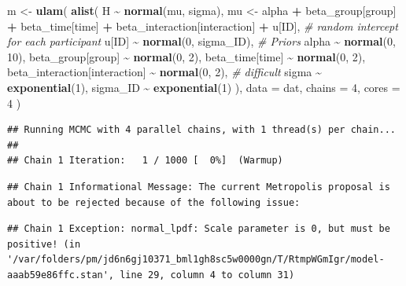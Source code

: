 \documentclass[
]{book}
\newenvironment{Shaded}{\begin{snugshade}}{\end{snugshade}}
\newcommand{\AttributeTok}[1]{\textcolor[rgb]{0.13,0.29,0.53}{#1}}
\newcommand{\CommentTok}[1]{\textcolor[rgb]{0.56,0.35,0.01}{\textit{#1}}}
\newcommand{\DecValTok}[1]{\textcolor[rgb]{0.00,0.00,0.81}{#1}}
\newcommand{\FunctionTok}[1]{\textcolor[rgb]{0.13,0.29,0.53}{\textbf{#1}}}
\newcommand{\NormalTok}[1]{#1}
\newcommand{\OtherTok}[1]{\textcolor[rgb]{0.56,0.35,0.01}{#1}}
\newcommand{\SpecialCharTok}[1]{\textcolor[rgb]{0.81,0.36,0.00}{\textbf{#1}}}
\begin{document}
\begin{Shaded}
\begin{Highlighting}[]
\NormalTok{m }\OtherTok{\textless{}{-}} \FunctionTok{ulam}\NormalTok{(}
  \FunctionTok{alist}\NormalTok{(}
\NormalTok{    H }\SpecialCharTok{\textasciitilde{}} \FunctionTok{normal}\NormalTok{(mu, sigma),}
\NormalTok{    mu }\OtherTok{\textless{}{-}}\NormalTok{ alpha }\SpecialCharTok{+}
\NormalTok{      beta\_group[group] }\SpecialCharTok{+}\NormalTok{ beta\_time[time] }\SpecialCharTok{+}\NormalTok{ beta\_interaction[interaction] }\SpecialCharTok{+}\NormalTok{ u[ID],}
    \CommentTok{\# random intercept for each participant}
\NormalTok{    u[ID] }\SpecialCharTok{\textasciitilde{}} \FunctionTok{normal}\NormalTok{(}\DecValTok{0}\NormalTok{, sigma\_ID),}
    \CommentTok{\# Priors}
\NormalTok{    alpha }\SpecialCharTok{\textasciitilde{}} \FunctionTok{normal}\NormalTok{(}\DecValTok{0}\NormalTok{, }\DecValTok{10}\NormalTok{),}
\NormalTok{    beta\_group[group] }\SpecialCharTok{\textasciitilde{}} \FunctionTok{normal}\NormalTok{(}\DecValTok{0}\NormalTok{, }\DecValTok{2}\NormalTok{),}
\NormalTok{    beta\_time[time] }\SpecialCharTok{\textasciitilde{}} \FunctionTok{normal}\NormalTok{(}\DecValTok{0}\NormalTok{, }\DecValTok{2}\NormalTok{),}
\NormalTok{    beta\_interaction[interaction] }\SpecialCharTok{\textasciitilde{}} \FunctionTok{normal}\NormalTok{(}\DecValTok{0}\NormalTok{, }\DecValTok{2}\NormalTok{), }\CommentTok{\# difficult}
\NormalTok{    sigma }\SpecialCharTok{\textasciitilde{}} \FunctionTok{exponential}\NormalTok{(}\DecValTok{1}\NormalTok{),}
\NormalTok{    sigma\_ID }\SpecialCharTok{\textasciitilde{}} \FunctionTok{exponential}\NormalTok{(}\DecValTok{1}\NormalTok{)}
\NormalTok{  ),}
  \AttributeTok{data =}\NormalTok{ dat,}
  \AttributeTok{chains =} \DecValTok{4}\NormalTok{,}
  \AttributeTok{cores =} \DecValTok{4}
\NormalTok{)}
\end{Highlighting}
\end{Shaded}

\begin{verbatim}
## Running MCMC with 4 parallel chains, with 1 thread(s) per chain...
## 
## Chain 1 Iteration:   1 / 1000 [  0%]  (Warmup)
\end{verbatim}

\begin{verbatim}
## Chain 1 Informational Message: The current Metropolis proposal is about to be rejected because of the following issue:
\end{verbatim}

\begin{verbatim}
## Chain 1 Exception: normal_lpdf: Scale parameter is 0, but must be positive! (in '/var/folders/pm/jd6n6gj10371_bml1gh8sc5w0000gn/T/RtmpWGmIgr/model-aaab59e86ffc.stan', line 29, column 4 to column 31)
\end{verbatim}
\end{document}

